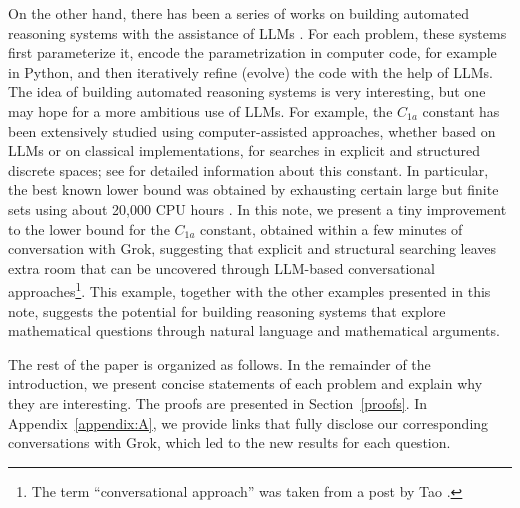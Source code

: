 \documentclass[11pt]{article}
\begin{document}
 
 On the other hand, there has been a series of works on building automated reasoning systems with the assistance of LLMs \cite{Georgiev25,Wang25,Yuksekgonul26}. For each problem, these systems first parameterize it, encode the parametrization in computer code, for example in Python, and then iteratively refine (evolve) the code with the help of LLMs. The idea of building automated reasoning systems is very interesting, but one may hope for a more ambitious use of LLMs. For example, the $C_{1a}$ constant has been extensively studied using computer-assisted approaches, whether based on LLMs or on classical implementations, for searches in explicit and structured discrete spaces; see \cite{OptConstC1a} for detailed information about this constant. In particular, the best known lower bound was obtained by exhausting certain large but finite sets using about 20{,}000 CPU hours \cite{CloningerSteinerberger17}. 
In this note, we present a tiny improvement to the lower bound for the $C_{1a}$ constant, obtained within a few minutes of conversation with Grok, suggesting that explicit and structural searching leaves extra room that can be uncovered through LLM-based conversational approaches\footnote{The term ``conversational approach'' was taken from a post by Tao \cite{Tao25Mathstodon}. }. This example, together with the other examples presented in this note, suggests the potential for building reasoning systems that explore mathematical questions through natural language and mathematical arguments. 



The rest of the paper is organized as follows. In the remainder of the introduction, we present concise statements of each problem and explain why they are interesting. The proofs are presented in Section~\ref{proofs}. In Appendix~\ref{appendix:A}, we provide links that fully disclose our corresponding conversations with Grok, which led to the new results for each question.

 
\end{document}

